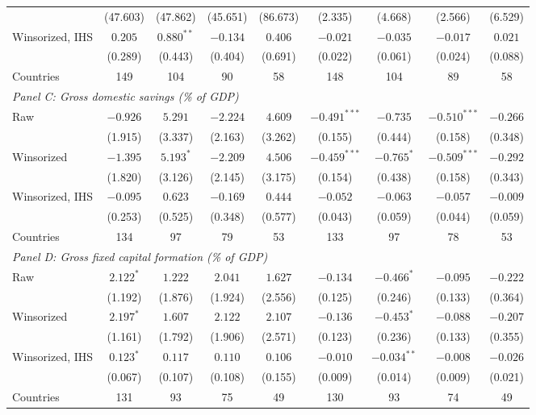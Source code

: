 \begin{table}[htbp]
{\begin{tabular}{lcccccccc}
 & (47.603) & (47.862) & (45.651) & (86.673) & (2.335) & (4.668) & (2.566) & (6.529) \\
Winsorized, IHS & $0.205$ & $0.880^{**}$ & $-0.134$ & $0.406$ & $-0.021$ & $-0.035$ & $-0.017$ & $0.021$ \\
 & (0.289) & (0.443) & (0.404) & (0.691) & (0.022) & (0.061) & (0.024) & (0.088) \\
Countries & 149 & 104 & 90 & 58 & 148 & 104 & 89 & 58 \\
\midrule
\multicolumn{9}{l}{\textit{Panel C: Gross domestic savings (\% of GDP)}} \\
Raw & $-0.926$ & $5.291$ & $-2.224$ & $4.609$ & $-0.491^{***}$ & $-0.735$ & $-0.510^{***}$ & $-0.266$ \\
 & (1.915) & (3.337) & (2.163) & (3.262) & (0.155) & (0.444) & (0.158) & (0.348) \\
Winsorized & $-1.395$ & $5.193^{*}$ & $-2.209$ & $4.506$ & $-0.459^{***}$ & $-0.765^{*}$ & $-0.509^{***}$ & $-0.292$ \\
 & (1.820) & (3.126) & (2.145) & (3.175) & (0.154) & (0.438) & (0.158) & (0.343) \\
Winsorized, IHS & $-0.095$ & $0.623$ & $-0.169$ & $0.444$ & $-0.052$ & $-0.063$ & $-0.057$ & $-0.009$ \\
 & (0.253) & (0.525) & (0.348) & (0.577) & (0.043) & (0.059) & (0.044) & (0.059) \\
Countries & 134 & 97 & 79 & 53 & 133 & 97 & 78 & 53 \\
\midrule
\multicolumn{9}{l}{\textit{Panel D: Gross fixed capital formation (\% of GDP)}} \\
Raw & $2.122^{*}$ & $1.222$ & $2.041$ & $1.627$ & $-0.134$ & $-0.466^{*}$ & $-0.095$ & $-0.222$ \\
 & (1.192) & (1.876) & (1.924) & (2.556) & (0.125) & (0.246) & (0.133) & (0.364) \\
Winsorized & $2.197^{*}$ & $1.607$ & $2.122$ & $2.107$ & $-0.136$ & $-0.453^{*}$ & $-0.088$ & $-0.207$ \\
 & (1.161) & (1.792) & (1.906) & (2.571) & (0.123) & (0.236) & (0.133) & (0.355) \\
Winsorized, IHS & $0.123^{*}$ & $0.117$ & $0.110$ & $0.106$ & $-0.010$ & $-0.034^{**}$ & $-0.008$ & $-0.026$ \\
 & (0.067) & (0.107) & (0.108) & (0.155) & (0.009) & (0.014) & (0.009) & (0.021) \\
Countries & 131 & 93 & 75 & 49 & 130 & 93 & 74 & 49 \\
\bottomrule
\end{tabular}}

\end{table}

